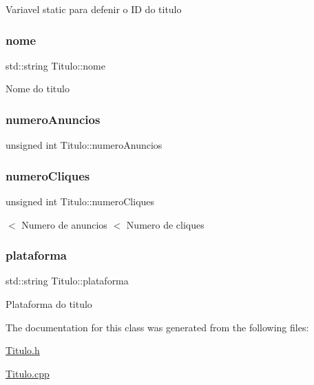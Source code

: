 Variavel static para defenir o ID do titulo \mbox{\label{classTitulo_a8abdf1fc6d4fc14be20bbec247664d83}} 
\subsubsection{\texorpdfstring{nome}{nome}}
{\footnotesize\ttfamily std\+::string Titulo\+::nome\hspace{0.3cm}{\ttfamily [protected]}}

Nome do titulo \mbox{\label{classTitulo_a31919af9268f0c6e55b786457d1df586}} 
\subsubsection{\texorpdfstring{numero\+Anuncios}{numeroAnuncios}}
{\footnotesize\ttfamily unsigned int Titulo\+::numero\+Anuncios\hspace{0.3cm}{\ttfamily [protected]}}

\mbox{\label{classTitulo_a7775da325c14a4d76f2d3b0800c28fa3}} 
\subsubsection{\texorpdfstring{numero\+Cliques}{numeroCliques}}
{\footnotesize\ttfamily unsigned int Titulo\+::numero\+Cliques\hspace{0.3cm}{\ttfamily [protected]}}

$<$ Numero de anuncios $<$ Numero de cliques \mbox{\label{classTitulo_a67761eb7f006453ab0869e4b7c0a9c0b}} 
\subsubsection{\texorpdfstring{plataforma}{plataforma}}
{\footnotesize\ttfamily std\+::string Titulo\+::plataforma\hspace{0.3cm}{\ttfamily [protected]}}

Plataforma do titulo 

The documentation for this class was generated from the following files\+:\begin{DoxyCompactItemize}
\item 
\hyperlink{Titulo_8h}{Titulo.\+h}\item 
\hyperlink{Titulo_8cpp}{Titulo.\+cpp}\end{DoxyCompactItemize}
